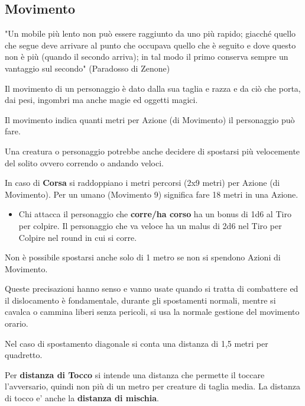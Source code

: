 \documentclass[a4paper,11pt,twoside,openany]{book}
\begin{document}
\subsection{Movimento}

\label{movimento}

\begin{tcolorbox}[enhanced,arc=5pt,boxrule=0.3pt]{"Un mobile più lento non può essere raggiunto da uno più rapido; giacché quello che segue deve arrivare al punto che occupava quello che è seguito e dove questo non è più (quando il secondo arriva); in tal modo il primo conserva sempre un vantaggio sul secondo" (Paradosso di Zenone)}
\end{tcolorbox}\medskip

Il movimento di un personaggio è dato dalla sua taglia e razza e da ciò che porta, dai pesi, ingombri ma anche magie ed oggetti magici.

Il movimento indica quanti metri per Azione (di Movimento) il personaggio può fare.

Una creatura o personaggio potrebbe anche decidere di spostarsi più velocemente del solito ovvero correndo o andando veloci.

In caso di \textbf{Corsa} si raddoppiano i metri percorsi (2x9 metri) per Azione (di Movimento). Per un umano (Movimento 9) significa fare 18 metri in una Azione.

\begin{itemize}
\item Chi attacca il personaggio che \textbf{corre/ha corso} ha un bonus di 1d6 al Tiro per colpire. Il personaggio che va veloce ha un malus di 2d6 nel Tiro per Colpire nel round in cui si corre.
\end{itemize}

Non è possibile spostarsi anche solo di 1 metro se non si spendono Azioni di Movimento.

Queste precisazioni hanno senso e vanno usate quando si tratta di combattere ed il dislocamento è fondamentale, durante gli spostamenti normali, mentre si cavalca o cammina liberi senza pericoli, si usa la normale gestione del movimento orario.

Nel caso di spostamento diagonale si conta una distanza di 1,5 metri per quadretto.

Per \textbf{distanza di Tocco}  si intende una distanza che permette il toccare l'avversario, quindi non più di un metro per creature di taglia media. La distanza di tocco e' anche la \textbf{distanza di mischia}.
\end{document}
